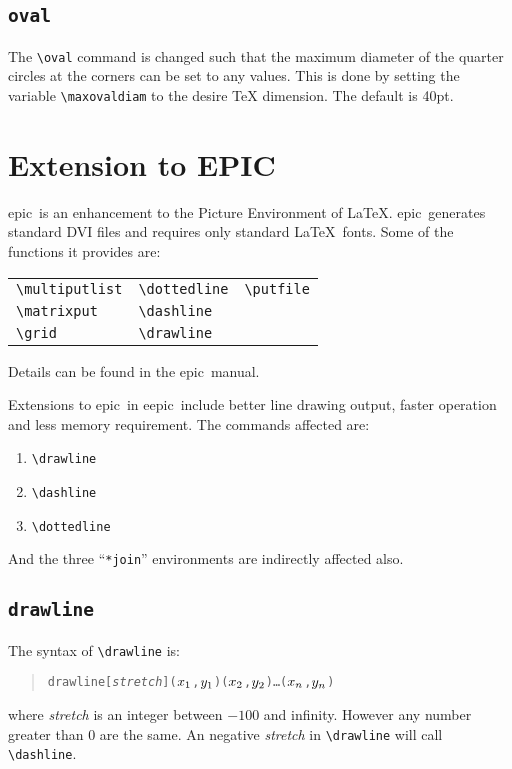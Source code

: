 \documentclass[11pt]{article}
\newcommand{\epic}{{\sc epic}}
\newcommand{\eepic}{{\sc eepic}}
\begin{document}
\subsection{\tt \BS oval}
The \verb|\oval| command is changed such that the maximum
diameter of the quarter circles at the corners can be set to any
values. This is done by setting the variable \verb|\maxovaldiam|
to the desire \TeX{} dimension. The default is 40pt.


\clearpage


\section{Extension to EPIC}
\epic\ is an enhancement to the Picture Environment of \LaTeX.
\epic\ generates standard DVI files and requires only standard
\LaTeX\ fonts. Some of the functions it provides are:
\begin{center}
\begin{tabular}{lll}
\verb|\multiputlist| & \verb|\dottedline| & \verb|\putfile| \\
\verb|\matrixput| & \verb|\dashline| \\
\verb|\grid| & \verb|\drawline| \\
\end{tabular}
\end{center}
Details can be found in the \epic\ manual. 

Extensions to \epic\ in \eepic\ include better line drawing
output, faster operation and less memory requirement. The
commands affected are:
\begin{enumerate}\parskip=0pt
\item \verb|\drawline|
\item \verb|\dashline|
\item \verb|\dottedline|
\end{enumerate}
And the three ``\verb|*join|'' environments are indirectly
affected also.


\subsection{\tt \BS drawline}
The syntax of \verb|\drawline| is:
\begin{quote}
\begin{alltt}
\BS{}drawline[{\em{}stretch}](\(x\sb{1}\),\(y\sb{1}\))(\(x\sb{2}\),\(y\sb{2}\))\ldots(\(x\sb{n}\),\(y\sb{n}\))
\end{alltt}
\end{quote}
where {\em stretch} is an integer between $-100$ and infinity.
However any number greater than 0 are the same. An negative {\em
stretch} in \verb|\drawline| will call \verb|\dashline|.
\end{document}
